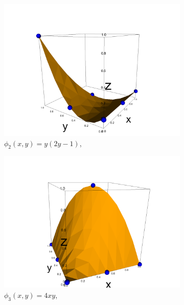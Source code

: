 \documentclass[12pt]{ociamthesis}
\begin{document}
\begin{figure}[H]
\begin{subfigure}{0.5\textwidth}
     \includegraphics[width=\textwidth]{Pics/BasisFunc/triBasis2.png}
     \caption{$\phi_2(x,y) = y(2y-1)$,}
 \end{subfigure}
 \hfill
 \begin{subfigure}{0.5\textwidth}
     \includegraphics[width=\textwidth]{Pics/BasisFunc/triBasis3.png}
     \caption{$\phi_3(x,y) = 4xy$,}
 \end{subfigure}
 \hfill
 \begin{subfigure}{0.5\textwidth}

\end{subfigure}
\end{figure}
\end{document}
